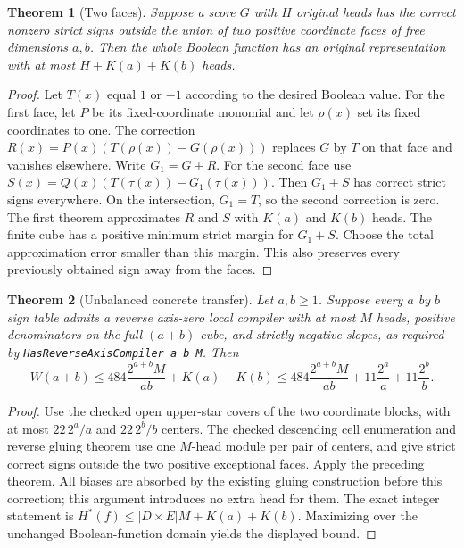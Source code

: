 \documentclass[11pt]{article}
\newtheorem{theorem}{Theorem}
\begin{document}
\begin{theorem}[Two faces]
Suppose a score $G$ with $H$ original heads has the correct nonzero
strict signs outside the union of two positive coordinate faces of
free dimensions $a,b$. Then the whole Boolean function has an original
representation with at most $H+K(a)+K(b)$ heads.
\end{theorem}
\begin{proof}
Let $T(x)$ equal $1$ or $-1$ according to the desired Boolean value.
For the first face, let $P$ be its fixed-coordinate monomial and let
$\rho(x)$ set its fixed coordinates to one. The correction
$R(x)=P(x)(T(\rho(x))-G(\rho(x)))$ replaces $G$ by $T$ on that face
and vanishes elsewhere. Write $G_1=G+R$. For the second face use
$S(x)=Q(x)(T(\tau(x))-G_1(\tau(x)))$.
Then $G_1+S$ has correct strict signs everywhere. On the intersection,
$G_1=T$, so the second correction is zero. The first theorem approximates
$R$ and $S$ with $K(a)$ and $K(b)$ heads. The finite cube has a positive
minimum strict margin for $G_1+S$. Choose the total approximation error
smaller than this margin. This also preserves every previously obtained
sign away from the faces.
\end{proof}

\begin{theorem}[Unbalanced concrete transfer]
Let $a,b\geq1$. Suppose every $a$ by $b$ sign table admits a reverse
axis-zero local compiler with at most $M$ heads, positive denominators
on the full $(a+b)$-cube, and strictly negative slopes, as required by
\texttt{HasReverseAxisCompiler a b M}. Then
\[
 W(a+b)\leq 484\frac{2^{a+b}M}{ab}
       +K(a)+K(b)
 \leq484\frac{2^{a+b}M}{ab}
       +11\frac{2^a}{a}+11\frac{2^b}{b}.
\]
\end{theorem}
\begin{proof}
Use the checked open upper-star covers of the two coordinate blocks,
with at most $22\,2^a/a$ and $22\,2^b/b$ centers. The checked descending
cell enumeration and reverse gluing theorem use one $M$-head module per
pair of centers, and give strict correct signs outside the two positive
exceptional faces. Apply the preceding theorem. All biases are absorbed
by the existing gluing construction before this correction; this argument
introduces no extra head for them. The exact integer statement is
$H^*(f)\leq |D\times E|M+K(a)+K(b)$. Maximizing over the unchanged
Boolean-function domain yields the displayed bound.
\end{proof}
\end{document}
